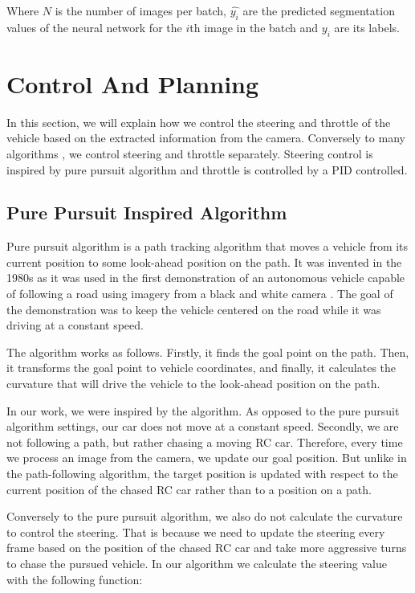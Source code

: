 \documentclass{ctuthesis/ctuthesis}
\begin{document}
Where $N$ is the number of images per batch, $\hat{y_i}$ are the predicted segmentation values of the neural network for the $i$th image in the batch and $y_i$ are its labels. 




\section{Control And Planning}
In this section, we will explain how we control the steering and throttle of the vehicle based on the extracted information from the camera. Conversely to many algorithms \cite{Broggi2013,Werling2010}, we control steering and throttle separately. Steering control is inspired by pure pursuit algorithm and throttle is controlled by a PID controlled.


\subsection{Pure Pursuit Inspired Algorithm} \label{sec:pure_pursuit}
Pure pursuit algorithm is a path tracking algorithm that moves a vehicle from its current position to some look-ahead position on the path. It was invented in the 1980s as it was used in the first demonstration of an autonomous vehicle capable of following a road using imagery from a black and white camera \cite{pure_pursuit_orig}. The goal of the demonstration was to keep the vehicle centered on the road while it was driving at a constant speed.\par


The algorithm works as follows. Firstly, it finds the goal point on the path. Then, it transforms the goal point to vehicle coordinates, and finally, it calculates the curvature that will drive the vehicle to the look-ahead position on the path. \par


In our work, we were inspired by the algorithm. As opposed to the pure pursuit algorithm settings, our car does not move at a constant speed. Secondly, we are not following a path, but rather chasing a moving RC car. Therefore, every time we process an image from the camera, we update our goal position. But unlike in the path-following algorithm, the target position is updated with respect to the current position of the chased RC car rather than to a position on a path. \par
Conversely to the pure pursuit algorithm, we also do not calculate the curvature to control the steering. That is because we need to update the steering every frame based on the position of the chased RC car and take more aggressive turns to chase the pursued vehicle. In our algorithm we calculate the steering value with the following function:
\end{document}
